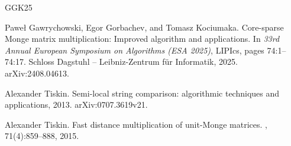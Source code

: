 \documentclass[10pt]{article}
\begin{document}
\begin{thebibliography}{GGK25}

Pawe{\l} Gawrychowski, Egor Gorbachev, and Tomasz Kociumaka.
\newblock Core-sparse {M}onge matrix multiplication: Improved algorithm and
  applications.
\newblock In {\em 33rd Annual European Symposium on Algorithms (ESA 2025)},
  LIPIcs, pages 74:1--74:17. Schloss Dagstuhl -- Leibniz-Zentrum f\"{u}r
  Informatik, 2025.
\newblock arXiv:2408.04613.

Alexander Tiskin.
\newblock Semi-local string comparison: algorithmic techniques and
  applications, 2013.
\newblock arXiv:0707.3619v21.

Alexander Tiskin.
\newblock Fast distance multiplication of unit-{M}onge matrices.
, 71(4):859--888, 2015.

\end{thebibliography}
\end{document}
